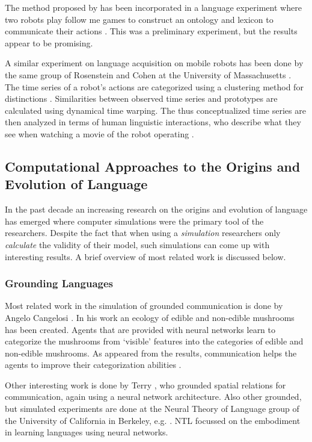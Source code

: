 The method proposed by  has been incorporated in a language experiment where two robots play follow me games to construct an ontology and lexicon to communicate their actions \cite{vogt:1999a,vogt:2000}. This was a preliminary experiment, but the results appear to be promising.

A similar experiment on language acquisition on mobile robots has been done by the same group of Rosenstein and Cohen at the University of Massachusetts \cite{oatesetal:1999}. The time series of a robot's actions are categorized using a clustering method for distinctions \cite{oates:1999}. Similarities between observed time series and prototypes are calculated using dynamical time warping. The thus conceptualized time series are then analyzed in terms of human linguistic interactions, who describe what they see when watching a movie of the robot operating \cite{oatesetal:1999}.

\subsection{Computational Approaches to the Origins and Evolution of Language}

In the past decade an increasing research on the origins and evolution of language has emerged where computer simulations were the primary tool of the researchers. Despite the fact that when using a {\em simulation} researchers only {\em calculate} the validity of their model, such simulations can come up with interesting results. A brief overview of most related work is discussed below.

\subsubsection{Grounding Languages}

Most related work in the simulation of grounded communication is done by Angelo Cangelosi \cite{cangelosi:1998}. In his work an ecology of edible and non-edible mushrooms has been created. Agents that are provided with neural networks learn to categorize the mushrooms from `visible' features into the categories of edible and non-edible mushrooms. As appeared from the results, communication helps the agents to improve their categorization abilities \cite{cangelosiharnad:2000}.

Other interesting work is done by Terry , who grounded spatial relations for communication, again using a neural network architecture. Also other grounded, but simulated experiments are done at the Neural Theory of Language group of the University of California in Berkeley, e.g. \cite{bailyetal:1998}. NTL focussed on the embodiment in learning languages using neural networks.

